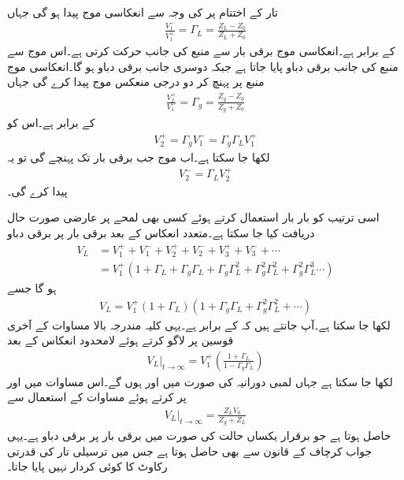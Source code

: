 تار کے اختتام پر  کی وجہ سے انعکاسی موج  پیدا ہو گی جہاں
\begin{align*}
\frac{V_1^-}{V_1^+}=\Gamma_L=\frac{Z_L-Z_0}{Z_L+Z_0}
\end{align*}
 کے برابر ہے۔انعکاسی موج برقی بار سے منبع کی جانب حرکت کرتی ہے۔اس موج سے منبع کی جانب  برقی دباو پایا جاتا ہے جبکہ دوسری جانب  برقی دباو ہو گا۔انعکاسی موج  منبع پر پہنچ کر دو درجی منعکس موج  پیدا کرے گی جہاں
\begin{align*}
\frac{V_2^+}{V_1^-}=\Gamma_g=\frac{Z_g-Z_0}{Z_g+Z_0}
\end{align*}
کے برابر ہے۔اس کو
\begin{align*}
V_2^+=\Gamma_g V_1^-=\Gamma_g \Gamma_L V_1^+
\end{align*}
لکھا جا سکتا ہے۔اب  موج جب برقی بار تک پہنچے گی تو یہ 
\begin{align*}
V_2^-=\Gamma_L V_2^+
\end{align*}
 پیدا کرے گی۔

اسی ترتیب کو بار بار استعمال کرتے ہوئے کسی بھی لمحے پر عارضی صورت حال دریافت کیا جا سکتا ہے۔متعدد انعکاس کے بعد برقی بار پر برقی دباو
\begin{align*}
V_L&=V_1^+ + V_1^- + V_2^+ + V_2^- + V_3^+ + V_3^- + \cdots\\
&=V_1^+ (1+\Gamma_L + \Gamma_g \Gamma_L + \Gamma_g \Gamma_L ^2+\Gamma_g^2 \Gamma_L^2+\Gamma_g^2 \Gamma_L^3\cdots )
\end{align*}
ہو گا جسے
\begin{align*}
V_L=V_1^+(1+\Gamma_L)(1+\Gamma_g \Gamma_L+\Gamma_g^2 \Gamma_L^2+\cdots)
\end{align*}
لکھا جا سکتا ہے۔آپ جانتے ہیں کہ  کے برابر ہے۔یہی کلیہ مندرجہ بالا مساوات کے آخری قوسین پر لاگو کرتے ہوئے  لامحدود انعکاس کے بعد
\begin{align*}
\left. V_L \right|_{t \to \infty}=V_1^+\left(\frac{1+\Gamma_L}{1-\Gamma_g \Gamma_L}\right) 
\end{align*}
لکھا جا سکتا ہے جہاں لمبی دورانیہ   کی صورت میں   اور  ہوں گے۔اس مساوات میں  اور  پر کرتے ہوئے مساوات  کے استعمال  سے
\begin{align*}
\left. V_L \right|_{t \to \infty}=\frac{Z_L V_0}{Z_g+Z_L}
\end{align*}
حاصل ہوتا ہے جو برقرار یکساں حالت کی صورت میں برقی بار پر برقی دباو ہے۔یہی جواب کرچاف کے قانون سے بھی حاصل ہوتا ہے جس میں ترسیلی تار کی قدرتی رکاوٹ کا کوئی کردار نہیں پایا جاتا۔

